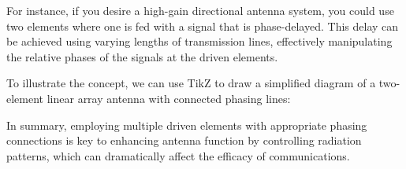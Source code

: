 For instance, if you desire a high-gain directional antenna system, you could use two elements where one is fed with a signal that is phase-delayed. This delay can be achieved using varying lengths of transmission lines, effectively manipulating the relative phases of the signals at the driven elements.

To illustrate the concept, we can use TikZ to draw a simplified diagram of a two-element linear array antenna with connected phasing lines: 

\begin{center}
\end{center}

In summary, employing multiple driven elements with appropriate phasing connections is key to enhancing antenna function by controlling radiation patterns, which can dramatically affect the efficacy of communications.